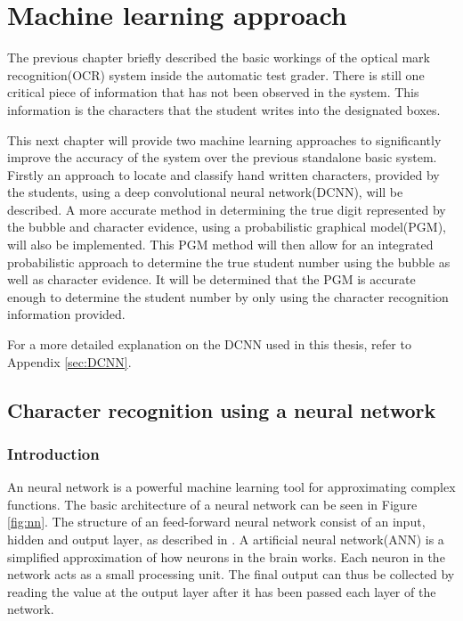 \chapter{Machine learning approach}
\label{ch:MachineLearning}
\graphicspath{{Chapter4/Chapter4Figures/}}
The previous chapter briefly described the basic workings of the optical mark recognition(OCR) system inside the automatic test grader. There is still one critical piece of information that has not been observed in the system. This information is the characters that the student writes into the designated boxes.

This next chapter will provide two machine learning approaches to significantly improve the accuracy of the system over the previous standalone basic system. Firstly an approach to locate and classify hand written characters, provided by the students, using a deep convolutional neural network(DCNN), will be described. A more accurate method in determining the true digit represented by the bubble and character evidence, using a probabilistic  graphical model(PGM), will also be implemented. This PGM method will then allow for an integrated probabilistic approach to determine the true student number using the bubble as well as character evidence. It will be determined that the PGM is accurate enough to determine the student number by only using the character recognition information provided.

For a more detailed explanation on the DCNN used in this thesis, refer to Appendix \ref{sec:DCNN}.

\section{Character recognition using a neural network}

\subsection{Introduction}

An neural network is a powerful machine learning tool for approximating complex functions. The basic architecture of a neural network can be seen in Figure \ref{fig:nn}. The structure of an feed-forward neural network consist of an input, hidden and output layer, as described in \citet{MichealN2015}. A artificial neural network(ANN) is a simplified approximation of how neurons in the brain works. Each neuron in the network acts as a small processing unit. The final output can thus be collected by reading the value at the output layer after it has been passed each layer of the network.

